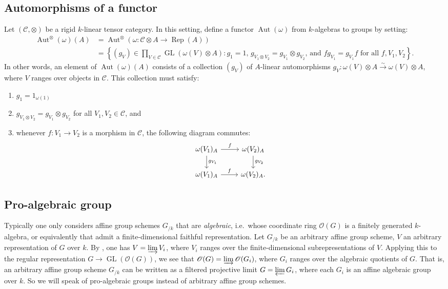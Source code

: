 \documentclass{article}
\DeclareMathOperator{\aut}{Aut}
\DeclareMathOperator{\GL}{GL}
\DeclareMathOperator{\rep}{Rep}
\newcommand{\cC}{\mathcal{C}}
\newcommand{\sO}{\mathscr{O}}
\newcommand{\iso}{\xrightarrow\sim}
\begin{document}
\subsection{Automorphisms of a functor}

Let $(\cC,\otimes)$ be a rigid $k$-linear tensor category. In this setting, 
define a functor $\aut(\omega)$ from $k$-algebras to groups by setting: 
\begin{align*}
  \aut^\otimes(\omega)(A) 
    &= \aut^\otimes\left(\omega:\cC\otimes A\to \rep(A)\right) \\
    &= \left\{(g_V)\in \prod_{V\in \cC} \GL(\omega(V)\otimes A):g_1=1\text{, }g_{V_1\otimes V_2} = g_{V_1}\otimes g_{V_2}\text{, and }f g_{V_1} = g_{V_1} f\text{ for all }f,V_1,V_2\right\} .
\end{align*}
In other words, an element of $\aut(\omega)(A)$ consists of a collection 
$(g_V)$ of $A$-linear automorphisms 
$g_V:\omega(V)\otimes A\iso \omega(V)\otimes A$, where $V$ ranges over objects 
in $\cC$. This collection must satisfy: 
\begin{enumerate}
  \item $g_1 = 1_{\omega(1)}$
  \item $g_{V_1\otimes V_2} = g_{V_1}\otimes g_{V_2}$ for all $V_1,V_2\in \cC$, and 
  \item whenever $f:V_1\to V_2$ is a morphism in $\cC$, the following diagram 
    commutes: 
    \[
    \begin{tikzcd}
      \omega(V_1)_A \ar[r, "f"] \ar[d, "g_{V_1}"] 
        & \omega(V_2)_A \ar[d, "g_{V_2}"] \\
      \omega(V_1)_A \ar[r, "f"] 
        & \omega(V_2)_A .
    \end{tikzcd}
    \]
\end{enumerate}


\subsection{Pro-algebraic group}

Typically one only considers affine group schemes $G_{/k}$ that are 
\emph{algebraic}, i.e.~whose coordinate ring $\sO(G)$ is a finitely generated 
$k$-algebra, or equivalently that admit a finite-dimensional faithful 
representation. Let $G_{/k}$ be an arbitrary affine group scheme, $V$ an 
arbitrary representation of $G$ over $k$. By 
\cite[Cor.~2.4]{deligne-milne-1982}, one has $V=\varinjlim V_i$, where $V_i$ 
ranges over the finite-dimensional subrepresentations of $V$. Applying this to 
the regular representation $G\to \GL(\sO(G))$, we see that 
$\sO(G)=\varinjlim\sO(G_i)$, where $G_i$ ranges over the algebraic quotients of 
$G$. That is, an arbitrary affine group scheme $G_{/k}$ can be written as a 
filtered projective limit $G=\varprojlim G_i$, where each $G_i$ is an affine 
algebraic group over $k$. So we will speak of pro-algebraic groups instead of 
arbitrary affine group schemes. 
\end{document}
